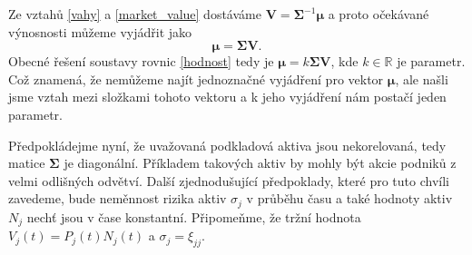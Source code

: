 \documentclass[a4paper,12pt]{report}
\theoremstyle{definition} \newtheorem{definice}[veta]{Definice}
\theoremstyle{remark}
\begin{document}
Ze vztahů \eqref{vahy} a \eqref{market_value} dostáváme $\boldsymbol{V}=\boldsymbol{\Sigma}^{-1}\boldsymbol{\mu}$ a proto očekávané výnosnosti můžeme vyjádřit jako
\begin{equation} \label{mu}
\boldsymbol{\mu}=\boldsymbol{\Sigma}\boldsymbol{V}.
\end{equation}
Obecné řešení soustavy rovnic \eqref{hodnost} tedy je $\boldsymbol{\mu}=k\boldsymbol{\Sigma}\boldsymbol{V}$, kde $k\in\mathbb{R}$ je parametr. Což znamená, že nemůžeme najít jednoznačné vyjádření pro vektor $\boldsymbol{\mu}$, ale našli jsme vztah mezi složkami tohoto vektoru a k jeho vyjádření nám postačí jeden parametr.

Předpokládejme nyní, že uvažovaná podkladová aktiva jsou nekorelovaná, tedy matice $\boldsymbol{\Sigma}$ je diagonální.
Příkladem takových aktiv by mohly být akcie podniků z velmi odlišných odvětví.
Další zjednodušující předpoklady, které pro tuto chvíli zavedeme, bude neměnnost rizika aktiv $\sigma_j$ v průběhu času a také hodnoty aktiv $N_j$ nechť jsou v čase konstantní.
Připomeňme, že tržní hodnota  $V_j(t)=P_j(t)N_j(t)$ a $\sigma_{j}=\xi_{jj}$.
\end{document}
